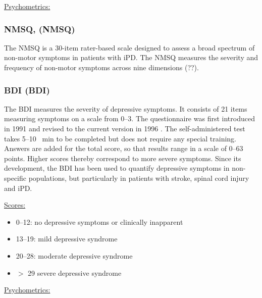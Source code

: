 \underline{Psychometrics:}

\subsubsection{\acl{NMSQ}, (\acs{NMSQ})}
\label{questionnaires:NMSQ}
The \ac{NMSQ} is a 30-item rater-based scale designed to assess a broad spectrum of non-motor symptoms in patients with \ac{iPD}.
The \ac{NMSQ} measures the severity and frequency of non-motor symptoms across nine dimensions (??).

\subsubsection{\acl{BDI} (\acs{BDI})}
\label{questionnaires:BDI}

The \acl{BDI} measures the severity of depressive symptoms. It consists of 21 items  measuring symptoms on a scale from 0--3. The questionnaire was first introduced in 1991 \cite{beck1987bdi1} and revised to the current version in 1996 \cite{beck1996bdi2}. The self-administered test takes \numrange{5}{10} \SI{}{\minute} to be completed but does not require any special training. Answers are added for the total score, so that results range in a scale of 0--63 points. Higher scores thereby correspond to more severe symptoms. Since its development, the \ac{BDI} has been used to quantify depressive symptoms in non-specific populations, but particularly in patients with stroke, spinal cord injury and \ac{iPD}. 

\underline{Scores:}
\begin{itemize}\itemsep2pt
\item 0--12: no depressive symptoms or clinically inapparent
\item 13--19: mild depressive syndrome
\item 20--28: moderate depressive syndrome
\item $>$ 29 severe depressive syndrome
\end{itemize}

\underline{Psychometrics:}

